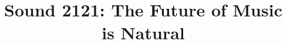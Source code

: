 \documentclass[sigchi]{acmart}
\begin{document}
\title{Sound 2121: The Future of Music is Natural}







\end{document}
